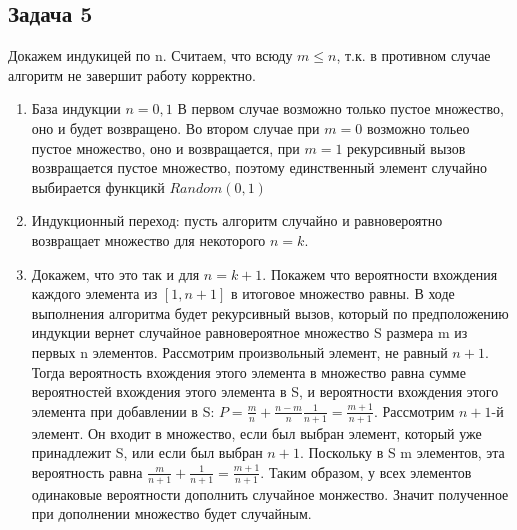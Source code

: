 \documentclass[a4paper,14pt]{article} %
\begin{document}
\subsection{Задача 5}
Докажем индукицей по n. Считаем, что всюду $m \leq n$, т.к. в противном случае алгоритм не завершит работу корректно. 
\begin{enumerate}
	\item База индукции $n = 0, 1$ В первом случае возможно только пустое множество, оно и будет возвращено.
	Во втором случае при $m = 0$ возможно тольео пустое множество, оно и возвращается, при $m = 1$ рекурсивный вызов возвращается пустое множество, поэтому
	единственный элемент случайно выбирается функцикй $Random(0, 1)$
	\item Индукционный переход: пусть алгоритм случайно и равновероятно возвращает множество для некоторого $n = k$. 
	\item Докажем, что это так и для $n = k + 1$. Покажем что вероятности вхождения каждого элемента из $[1, n+1]$ в итоговое множество равны.
	В ходе выполнения алгоритма будет рекурсивный вызов, который по предположению индукции вернет случайное равновероятное множество S размера m из первых n элементов.
	Рассмотрим произвольный элемент, не равный $n + 1$. Тогда вероятность вхождения этого элемента в множество равна сумме вероятностей вхождения этого элемента в S, и вероятности 
	вхождения этого элемента при добавлении в S: $P = \frac{m}{n} + \frac{n-m}{n}\frac{1}{n+1} = \frac{m+1}{n+1}$. Рассмотрим $n+1$-й элемент.
	Он входит в множество, если был выбран элемент, который уже принадлежит S, или если был выбран $n+1$. Поскольку в S m элементов, эта вероятность равна $\frac{m}{n+1} + \frac{1}{n+1} = \frac{m+1}{n+1}$.
	Таким образом, у всех элементов одинаковые вероятности дополнить случайное монжество. Значит полученное при дополнении множество будет случайным.
\end{enumerate}
\end{document}
